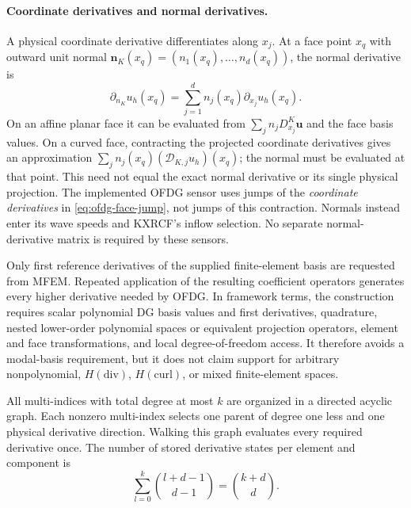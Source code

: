 \paragraph{Coordinate derivatives and normal derivatives.}
A physical coordinate derivative differentiates along $x_j$. At a face
point $x_q$ with outward unit normal
$\boldsymbol n_K(x_q)=(n_1(x_q),\ldots,n_d(x_q))$, the normal derivative is
\begin{equation}
 \partial_{n_K}u_h(x_q)=\sum_{j=1}^d n_j(x_q)\partial_{x_j}u_h(x_q).
 \label{eq:ofdg-normal-derivative}
\end{equation}
On an affine planar face it can be evaluated from
$\sum_j n_jD_{x_j}^K\boldsymbol u$ and the face basis values. On a curved
face, contracting the projected coordinate derivatives gives an approximation
$\sum_j n_j(x_q)(\mathscr D_{K,j}u_h)(x_q)$; the normal must be evaluated
at that point. This need not equal the exact normal derivative or its single
physical projection. The implemented OFDG sensor uses jumps of the
\emph{coordinate derivatives} in \cref{eq:ofdg-face-jump}, not jumps of
this contraction. Normals instead enter its wave speeds and KXRCF's inflow
selection. No separate normal-derivative matrix is required by these sensors.

Only first reference derivatives of the supplied finite-element basis are
requested from MFEM.  Repeated application of the resulting coefficient
operators generates every higher derivative needed by OFDG.  In framework
terms, the construction requires scalar polynomial DG basis values and first
derivatives, quadrature, nested lower-order polynomial spaces or equivalent
projection operators, element and face transformations, and local
degree-of-freedom access.  It therefore avoids a modal-basis requirement, but it
does not claim support for arbitrary nonpolynomial, $H(\mathrm{div})$,
$H(\mathrm{curl})$, or mixed finite-element spaces.

All multi-indices with total degree at most $k$ are organized in a directed
acyclic graph.  Each nonzero multi-index selects one parent of degree one less and
one physical derivative direction.  Walking this graph evaluates every required
derivative once.  The number of stored derivative states per element and component
is
\begin{equation}
  \sum_{l=0}^k\binom{l+d-1}{d-1}=\binom{k+d}{d}.
\end{equation}

